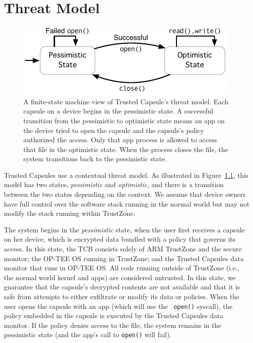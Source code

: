\chapter{Threat Model}
\label{ch:ThreatModel}
\begin{figure}
  \centering
  \includegraphics[width=\columnwidth]{fig/state-machine.pdf}
  \caption{A finite-state machine view of Trusted Capsule's threat model. Each
    capsule on a device begins in the pessimistic state. A successful transition
    from the pessimistic to optimistic state means an app on the device tried to
    open the capsule and the capsule's policy authorized the access. Only that
    app process is allowed to access that file in the optimistic state. When the
    process closes the file, the system transitions back to the pessimistic
    state.}
  \label{fig:threatmodelstatediag}
\end{figure}

Trusted Capsules use a contextual threat model. As illustrated in
Figure~\ref{fig:threatmodelstatediag}, this model has two states, {\em
  pessimistic} and {\em optimistic}, and there is a transition between
the two states depending on the context. We assume that device owners
have full control over the software stack running in the normal world
but may not modify the stack running within TrustZone.

The system begins in the {\em pessimistic} state, when the user first receives a
capsule on her device, which is encrypted data bundled with a policy that
governs its access. In this state, the TCB consists solely of ARM TrustZone and
the secure monitor; the OP-TEE OS running in TrustZone; and the Trusted Capsules
data monitor that runs in OP-TEE OS. All code running outside of TrustZone
(i.e., the normal world kernel and apps) are considered untrusted. In this
state, we guarantee that the capsule's decrypted contents are not available and
that it is safe from attempts to either exfiltrate or modify its data or
policies. When the user opens the capsule with an app (which will use the {\tt
  open()} syscall), the policy embedded in the capsule is executed by the
Trusted Capsules data monitor. If the policy denies access to the file, the
system remains in the pessimistic state (and the app's call to {\tt open()} will
fail).

